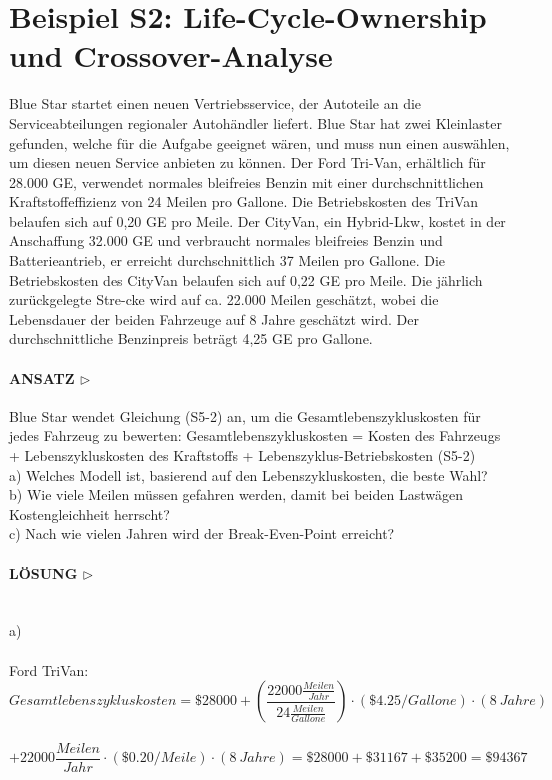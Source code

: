 \documentclass[13pt,titlepage]{article}
\begin{document}
\section*{Beispiel S2: Life-Cycle-Ownership und Crossover-Analyse}
Blue Star startet einen neuen Vertriebsservice, der Autoteile an die Serviceabteilungen regionaler Autohändler liefert. Blue Star hat zwei Kleinlaster gefunden, welche für die Aufgabe geeignet wären, und muss nun einen auswählen, um diesen neuen Service anbieten zu können. Der Ford Tri-Van, erhältlich für 28.000 GE, verwendet normales bleifreies Benzin mit einer durchschnittlichen Kraftstoffeffizienz von 24 Meilen pro Gallone. Die Betriebskosten des TriVan belaufen sich auf  0,20 GE pro Meile. Der CityVan, ein Hybrid-Lkw, kostet in der Anschaffung 32.000 GE und verbraucht normales bleifreies Benzin und Batterieantrieb, er erreicht durchschnittlich 37 Meilen pro Gallone. Die Betriebskosten des CityVan belaufen sich auf 0,22 GE pro Meile. Die jährlich zurückgelegte Stre-cke wird auf ca. 22.000 Meilen geschätzt, wobei die Lebensdauer der beiden Fahrzeuge auf 8 Jahre geschätzt wird. Der durchschnittliche Benzinpreis beträgt 4,25 GE pro Gallone.

\paragraph{\textbf{ANSATZ} $\triangleright$ }
Blue Star wendet Gleichung (S5-2) an, um die Gesamtlebenszykluskosten für jedes Fahrzeug zu bewerten:
Gesamtlebenszykluskosten = Kosten des Fahrzeugs + Lebenszykluskosten des Kraftstoffs + Lebenszyklus-Betriebskosten (S5-2)\\
a) Welches Modell ist, basierend auf den Lebenszykluskosten, die beste Wahl?\\
b) Wie viele Meilen m\"ussen gefahren werden, damit bei beiden Lastw\"agen Kostengleichheit herrscht?\\
c) Nach wie vielen Jahren wird der Break-Even-Point erreicht?

\paragraph{\textbf{LÖSUNG} $\triangleright$ }\mbox{}\\

a) \\\mbox{}\\
Ford TriVan:\\

$$ Gesamtlebenszykluskosten = \$28000 +(\frac{22000\frac{Meilen}{Jahr}}{24 \frac{Meilen}{Gallone}}) \cdot (\$4.25/Gallone) \cdot (8 \ Jahre)$$ \\ $$+ 22000 \frac{Meilen}{Jahr} \cdot  (\$0.20/Meile) \cdot  (8 \ Jahre) = \$28000 + \$31167 + \$35200 = \$94367$$\\
\mbox{}
\\
\end{document}
